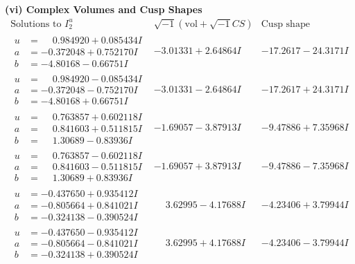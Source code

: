 \documentclass[1p]{elsarticle_modified}
\theoremstyle{definition}
\newcommand{\I}{\sqrt{-1}}
\begin{document}
\newpage\flushleft \textbf{(vi) Complex Volumes and Cusp Shapes}
$$\begin{array}{c|c|c}  
\text{Solutions to }I^u_{2}& \I (\text{vol} + \sqrt{-1}CS) & \text{Cusp shape}\\
 \hline 
\begin{aligned}
u &= \phantom{-}0.984920 + 0.085434 I \\
a &= -0.372048 + 0.752170 I \\
b &= -4.80168 - 0.66751 I\end{aligned}
 & -3.01331 + 2.64864 I & -17.2617 - 24.3171 I \\ \hline\begin{aligned}
u &= \phantom{-}0.984920 - 0.085434 I \\
a &= -0.372048 - 0.752170 I \\
b &= -4.80168 + 0.66751 I\end{aligned}
 & -3.01331 - 2.64864 I & -17.2617 + 24.3171 I \\ \hline\begin{aligned}
u &= \phantom{-}0.763857 + 0.602118 I \\
a &= \phantom{-}0.841603 + 0.511815 I \\
b &= \phantom{-}1.30689 - 0.83936 I\end{aligned}
 & -1.69057 - 3.87913 I & -9.47886 + 7.35968 I \\ \hline\begin{aligned}
u &= \phantom{-}0.763857 - 0.602118 I \\
a &= \phantom{-}0.841603 - 0.511815 I \\
b &= \phantom{-}1.30689 + 0.83936 I\end{aligned}
 & -1.69057 + 3.87913 I & -9.47886 - 7.35968 I \\ \hline\begin{aligned}
u &= -0.437650 + 0.935412 I \\
a &= -0.805664 + 0.841021 I \\
b &= -0.324138 - 0.390524 I\end{aligned}
 & \phantom{-}3.62995 - 4.17688 I & -4.23406 + 3.79944 I \\ \hline\begin{aligned}
u &= -0.437650 - 0.935412 I \\
a &= -0.805664 - 0.841021 I \\
b &= -0.324138 + 0.390524 I\end{aligned}
 & \phantom{-}3.62995 + 4.17688 I & -4.23406 - 3.79944 I \\ \hline\begin{aligned}

\end{aligned}
\end{array}$$
\end{document}
